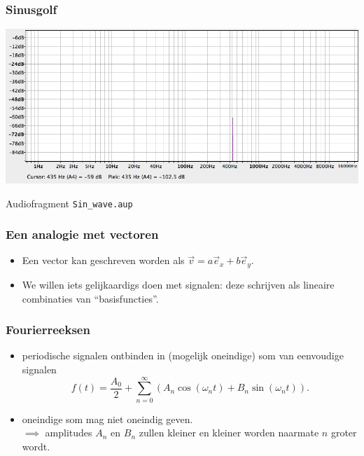 \documentclass[compress, darktitle, framenumber]{beamer}
\newcommand{\brac}[1]{\left( #1 \right)} %
\begin{document}
\begin{frame}
\frametitle{Sinusgolf}
\includegraphics[width=\textwidth]{images/Sin_wave.png}
\begin{block}{Audiofragment}
\texttt{Sin\_wave.aup}
\end{block}
\end{frame}

\begin{frame}[fragile]
\frametitle{Een analogie met vectoren}
\begin{itemize}
\item Een vector kan geschreven worden als $\vec{v}=a\vec{e}_x+b\vec{e}_y.$
\end{itemize}
\begin{center}
\end{center}
\begin{itemize}
\item We willen iets gelijkaardigs doen met signalen: deze schrijven als lineaire combinaties van ``basisfuncties''.
\end{itemize}
\end{frame}

\begin{frame}
\frametitle{Fourierreeksen}
\begin{itemize}
\item periodische signalen ontbinden in (mogelijk oneindige) som van eenvoudige signalen 
$$f(t)=\frac{A_0}{2}+\sum_{n=0}^{\infty}\brac{A_n \cos(\omega_n t)+B_n\sin(\omega_n t)}. $$
\item oneindige som mag niet oneindig geven. \\ \noindent 
$\implies$ amplitudes $A_n$ en $B_n$ zullen kleiner en kleiner worden naarmate $n$ groter wordt. 
\end{itemize}
\end{frame}
\end{document}

